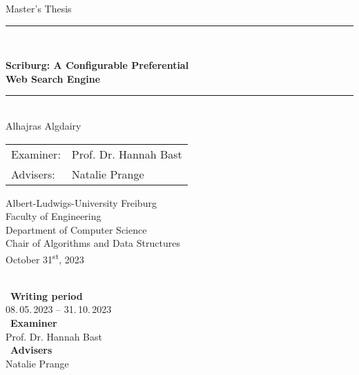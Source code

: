 
\begin{titlepage}
\begin{center}

\newcommand{\HorizontalLine}{\rule{\linewidth}{0.3mm}}

{\Large Master's Thesis}\\[1.3cm]


\HorizontalLine \\[0.4cm]
\begin{spacing}{3}
    {\huge \bfseries Scriburg: A Configurable Preferential} \\
    {\huge \bfseries  Web Search Engine} \\
\end{spacing}
\HorizontalLine \\[1.5cm]


{\Huge Alhajras Algdairy} \\[2cm]


\begin{tabular}[hc]{>{\huge}l >{\huge}l}
  Examiner: & Prof. Dr. Hannah Bast \\[0.3cm]
  Advisers: & Natalie Prange \\[1.2cm]
\end{tabular}
\vfill  %

\Large {
    Albert-Ludwigs-University Freiburg\\
    Faculty of Engineering\\
    Department of Computer Science\\
    Chair of Algorithms and Data Structures\\[1cm]

    October 31\textsuperscript{st}, 2023\\
}
\end{center}
\end{titlepage}

\ \vfill \ \\  %
\
\textbf{Writing period}            \smallskip{} \\
08.\,05.\,2023 -- 31.\,10.\,2023   \bigskip{} \\
\
\textbf{Examiner}                  \smallskip{} \\
Prof. Dr. Hannah Bast               \bigskip{} \\
\
\textbf{Advisers}                  \smallskip{} \\
Natalie Prange
